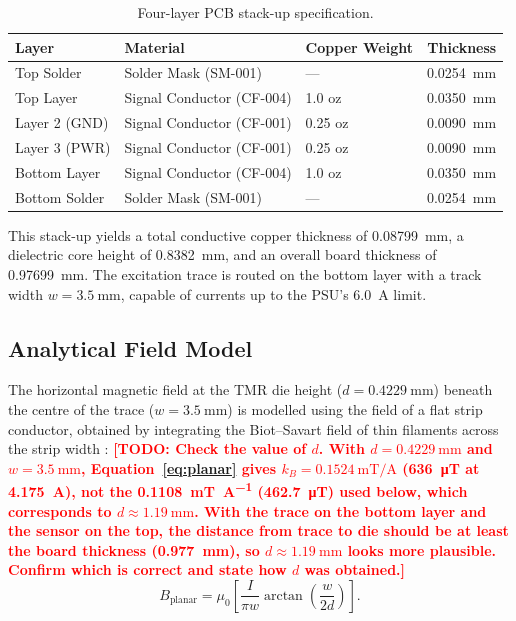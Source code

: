 \documentclass[12pt,a4paper]{article}
\newcommand{\todo}[1]{\textcolor{red}{\textbf{[TODO: #1]}}}
\begin{document}
\begin{table}[h]
\centering
\caption{Four-layer PCB stack-up specification.}
\label{tab:stackup}
\begin{tabular}{@{}lllr@{}}
\toprule
Layer & Material & Copper Weight & Thickness \\
\midrule
Top Solder & Solder Mask (SM-001) & --- & \SI{0.0254}{\milli\metre} \\
Top Layer & Signal Conductor (CF-004) & 1.0 oz & \SI{0.0350}{\milli\metre} \\
Layer 2 (GND) & Signal Conductor (CF-001) & 0.25 oz & \SI{0.0090}{\milli\metre} \\
Layer 3 (PWR) & Signal Conductor (CF-001) & 0.25 oz & \SI{0.0090}{\milli\metre} \\
Bottom Layer & Signal Conductor (CF-004) & 1.0 oz & \SI{0.0350}{\milli\metre} \\
Bottom Solder & Solder Mask (SM-001) & --- & \SI{0.0254}{\milli\metre} \\
\bottomrule
\end{tabular}
\end{table}

This stack-up yields a total conductive copper thickness of \SI{0.08799}{\milli\metre}, a dielectric core height of \SI{0.8382}{\milli\metre}, and an overall board thickness of \SI{0.97699}{\milli\metre}. The excitation trace is routed on the bottom layer with a track width \(w = \SI{3.5}{\milli\metre}\), capable of currents up to the PSU's \SI{6.0}{\ampere} limit.

\subsection{Analytical Field Model}
\label{sec:field-model}

The horizontal magnetic field at the TMR die height (\(d = \SI{0.4229}{\milli\metre}\)) beneath the centre of the trace (\(w = \SI{3.5}{\milli\metre}\)) is modelled using the field of a flat strip conductor, obtained by integrating the Biot--Savart field of thin filaments across the strip width \cite{jackson}: \todo{Check the value of $d$. With $d = \SI{0.4229}{\milli\metre}$ and $w = \SI{3.5}{\milli\metre}$, Equation~\eqref{eq:planar} gives $k_B = \SI{0.1524}{\milli\tesla\per\ampere}$ (\SI{636}{\micro\tesla} at \SI{4.175}{\ampere}), not the \SI{0.1108}{\milli\tesla\per\ampere} (\SI{462.7}{\micro\tesla}) used below, which corresponds to $d \approx \SI{1.19}{\milli\metre}$. With the trace on the bottom layer and the sensor on the top, the distance from trace to die should be at least the board thickness (\SI{0.977}{\milli\metre}), so $d \approx \SI{1.19}{\milli\metre}$ looks more plausible. Confirm which is correct and state how $d$ was obtained.}
\begin{equation}
B_{\text{planar}} = \mu_0 \left[ \frac{I}{\pi w} \arctan\left( \frac{w}{2d} \right) \right].
\label{eq:planar}
\end{equation}
\end{document}

